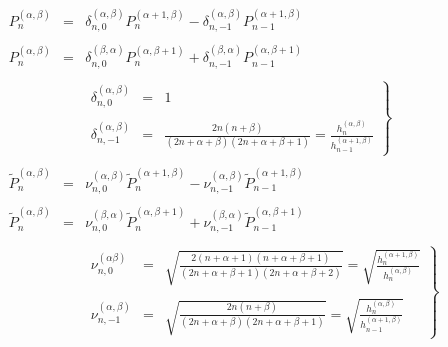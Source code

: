 \begin{eqnarray}
  P_n^{(\alpha, \beta)} & = & \delta_{n, 0}^{(\alpha, \beta)} P_n^{(\alpha +
  1, \beta)} - \delta_{n, - 1}^{(\alpha, \beta)} P_{n - 1}^{(\alpha + 1,
  \beta)}  \label{eq:jacform-ap}\\
  &  &  \nonumber\\
  P_n^{(\alpha, \beta)} & = & \delta_{n, 0}^{(\beta, \alpha)} P_n^{(\alpha,
  \beta + 1)} + \delta_{n, - 1}^{(\beta, \alpha)} P_{n - 1}^{(\alpha, \beta +
  1)}  \label{eq:jacform-bp}\\
  &  &  \nonumber\\
  &  & \left. \begin{array}{lll}
    \delta_{n, 0}^{(\alpha, \beta)} & = & 1\\
    &  & \\
    \delta_{n, - 1}^{(\alpha, \beta)} & = & \frac{2 n (n + \beta)}{(2 n +
    \alpha + \beta) (2 n + \alpha + \beta + 1)} = \frac{h_n^{(\alpha,
    \beta)}}{h_{n - 1}^{(\alpha + 1, \beta)}}
  \end{array} \right\}  \label{eq:jacform-deltadef}\\
  &  &  \nonumber\\
  \tilde{P}_n^{(\alpha, \beta)} & = & \nu^{(\alpha, \beta)}_{n, 0}
  \tilde{P}_n^{(\alpha + 1, \beta)} - \nu^{(\alpha, \beta)}_{n, - 1}
  \tilde{P}_{n - 1}^{(\alpha + 1, \beta)}  \label{eq:jacform-apn}\\
  &  &  \nonumber\\
  \tilde{P}_n^{(\alpha, \beta)} & = & \nu_{n, 0}^{(\beta, \alpha)} 
  \tilde{P}^{(\alpha, \beta + 1)}_n + \nu^{(\beta, \alpha)}_{n, - 1} 
  \tilde{P}^{(\alpha, \beta + 1)}_{n - 1}  \label{eq:jacform-bpn}\\
  &  &  \nonumber\\
  &  & \left. \begin{array}{lll}
    \nu^{(\alpha \beta)}_{n, 0} & = & \sqrt{\frac{2 (n + \alpha + 1) (n +
    \alpha + \beta + 1)}{(2 n + \alpha + \beta + 1) (2 n + \alpha + \beta +
    2)}} = \sqrt{\frac{h_n^{(\alpha + 1, \beta)}}{h_n^{(\alpha, \beta)}}}\\
    &  & \\
    \nu^{(\alpha, \beta)}_{n, - 1} & = & \sqrt{\frac{2 n (n + \beta)}{(2 n +
    \alpha + \beta) (2 n + \alpha + \beta + 1)}} = \sqrt{\frac{h_n^{(\alpha,
    \beta)}}{h_{n - 1}^{(\alpha + 1, \beta)}}}
  \end{array} \right\}  \label{eq:jacform-deltatildedef}
\end{eqnarray}


